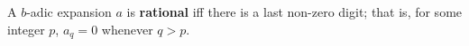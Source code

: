 A $b$-adic expansion $a$ is \textbf{rational} iff there is a last non-zero digit; that is, for some integer $p$, $a_q = 0$ whenever $q > p$.
